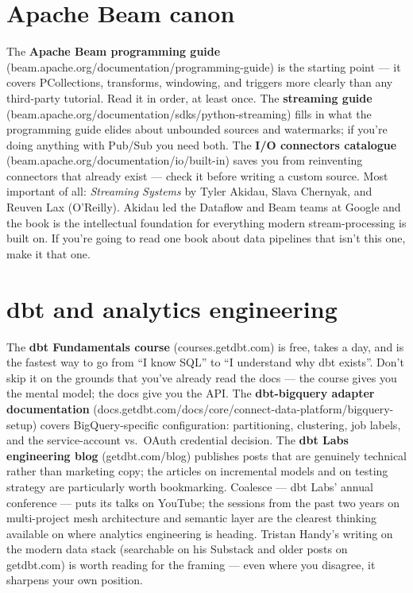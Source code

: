 \documentclass[
  11pt,
  british,
  oneside]{book}
\begin{document}
\hypertarget{apache-beam-canon}{%
\section{Apache Beam canon}\label{apache-beam-canon}}

The \textbf{Apache Beam programming guide}
(beam.apache.org/documentation/programming-guide) is the starting point
--- it covers PCollections, transforms, windowing, and triggers more
clearly than any third-party tutorial. Read it in order, at least once.
The \textbf{streaming guide}
(beam.apache.org/documentation/sdks/python-streaming) fills in what the
programming guide elides about unbounded sources and watermarks; if
you're doing anything with Pub/Sub you need both. The \textbf{I/O
connectors catalogue} (beam.apache.org/documentation/io/built-in) saves
you from reinventing connectors that already exist --- check it before
writing a custom source. Most important of all: \emph{Streaming Systems}
by Tyler Akidau, Slava Chernyak, and Reuven Lax (O'Reilly). Akidau led
the Dataflow and Beam teams at Google and the book is the intellectual
foundation for everything modern stream-processing is built on. If
you're going to read one book about data pipelines that isn't this one,
make it that one.

\hypertarget{dbt-and-analytics-engineering}{%
\section{dbt and analytics
engineering}\label{dbt-and-analytics-engineering}}

The \textbf{dbt Fundamentals course} (courses.getdbt.com) is free, takes
a day, and is the fastest way to go from ``I know SQL'' to ``I
understand why dbt exists''. Don't skip it on the grounds that you've
already read the docs --- the course gives you the mental model; the
docs give you the API. The \textbf{dbt-bigquery adapter documentation}
(docs.getdbt.com/docs/core/connect-data-platform/bigquery-setup) covers
BigQuery-specific configuration: partitioning, clustering, job labels,
and the service-account vs.~OAuth credential decision. The \textbf{dbt
Labs engineering blog} (getdbt.com/blog) publishes posts that are
genuinely technical rather than marketing copy; the articles on
incremental models and on testing strategy are particularly worth
bookmarking. Coalesce --- dbt Labs' annual conference --- puts its talks
on YouTube; the sessions from the past two years on multi-project mesh
architecture and semantic layer are the clearest thinking available on
where analytics engineering is heading. Tristan Handy's writing on the
modern data stack (searchable on his Substack and older posts on
getdbt.com) is worth reading for the framing --- even where you
disagree, it sharpens your own position.
\end{document}
